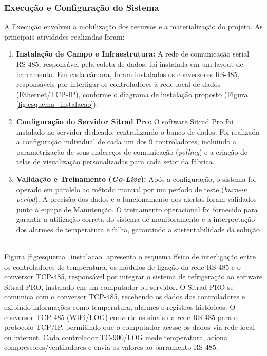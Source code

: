 \documentclass[12pt]{article}
\begin{document}
\subsubsection{Execução e Configuração do Sistema}

A Execução envolveu a mobilização dos recursos e a materialização do projeto. As principais atividades realizadas foram:

\begin{enumerate}
    \item \textbf{Instalação de Campo e Infraestrutura:} A rede de comunicação serial RS-485, responsável pela coleta de dados, foi instalada em um layout de barramento. Em cada câmara, foram instalados os conversores RS-485, responsáveis por interligar os controladores à rede local de dados (Ethernet/TCP-IP), conforme o diagrama de instalação proposto (Figura \ref{fig:esquema_instalacao}).
    \item \textbf{Configuração do Servidor Sitrad Pro:} O software Sitrad Pro foi instalado no servidor dedicado, centralizando o banco de dados. Foi realizada a configuração individual de cada um dos 9 controladores, incluindo a parametrização de seus endereços de comunicação (\textit{polling}) e a criação de telas de visualização personalizadas para cada setor da fábrica.
    \item \textbf{Validação e Treinamento (\textit{Go-Live}):} Após a configuração, o sistema foi operado em paralelo ao método manual por um período de teste (\textit{burn-in period}). A precisão dos dados e o funcionamento dos alertas foram validados junto à equipe de Manutenção. O treinamento operacional foi fornecido para garantir a utilização correta do sistema de monitoramento e a interpretação dos alarmes de temperatura e falha, garantindo a sustentabilidade da solução \cite{saviani2024}.
\end{enumerate}


Figura \ref{fig:esquema_instalacao} apresenta o esquema físico de interligação entre os controladores de temperatura, os módulos de ligação da rede RS-485 e o conversor TCP-485, responsável por integrar o sistema de refrigeração ao software Sitrad PRO, instalado em um computador ou servidor. O Sitrad PRO se comunica com o conversor TCP-485, recebendo os dados dos controladores e exibindo informações como temperatura, alarmes e registros históricos. O conversor TCP-485 (WiFi/LOG) converte os sinais da rede RS-485 para o protocolo TCP/IP, permitindo que o computador acesse os dados via rede local ou internet. Cada controlador TC-900/LOG mede temperatura, aciona compressores/ventiladores e envia os valores ao barramento RS-485.
\end{document}
